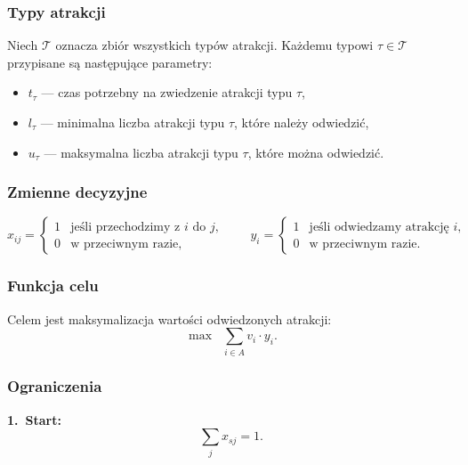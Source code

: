 \subsubsection{Typy atrakcji}

Niech $\mathcal{T}$ oznacza zbiór wszystkich typów atrakcji. Każdemu
typowi $\tau \in \mathcal{T}$ przypisane są następujące parametry:
\begin{itemize}
    \item $t_{\tau}$ --- czas potrzebny na zwiedzenie atrakcji typu $\tau$,
    \item $l_{\tau}$ --- minimalna liczba atrakcji typu $\tau$, które
          należy odwiedzić,
    \item $u_{\tau}$ --- maksymalna liczba atrakcji typu $\tau$, które
          można odwiedzić.
\end{itemize}

\subsubsection{Zmienne decyzyjne}

\[
x_{ij} =
\begin{cases}
1 & \text{jeśli przechodzimy z } i \text{ do } j, \\
0 & \text{w przeciwnym razie,}
\end{cases}
\qquad
y_i =
\begin{cases}
1 & \text{jeśli odwiedzamy atrakcję } i, \\
0 & \text{w przeciwnym razie.}
\end{cases}
\]

\subsubsection{Funkcja celu}

Celem jest maksymalizacja wartości odwiedzonych atrakcji:
\begin{equation}
\max \;\; \sum_{i \in A} v_i \cdot y_i .
\label{eq:obj}
\end{equation}

\subsubsection{Ograniczenia}

\textbf{1.\ Start:}
\begin{equation}
\sum_{j} x_{s j} = 1 .
\label{eq:start}
\end{equation}

